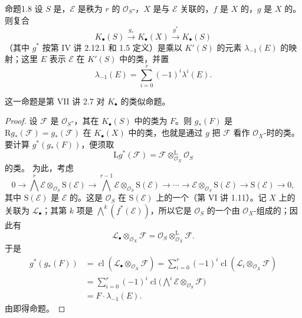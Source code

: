 \begin{SGAresult}{命题}{1.8}
设 $S$ 是，$\mathcal E$ 是秩为 $r$ 的 $\mathcal O_S$-，$X$ 是与 $\mathcal E$ 关联的，$f$ 是 $X$ 的，$g$ 是 $X$ 的。则复合
\[
K_\bullet(S)\xrightarrow{g_*}K_\bullet(X)\xrightarrow{g^*}K_\bullet(S)
\]
（其中 $g^*$ 按第 IV 讲 2.12.1 和 1.5 定义）是乘以 $K'(S)$ 的元素 $\lambda_{-1}(E)$ 的映射；这里 $E$ 表示 $\mathcal E$ 在 $K'(S)$ 中的类，并置
\[
\lambda_{-1}(E)=\sum_{i=0}^r(-1)^i\lambda^i(E).
\]
\end{SGAresult}
这一命题是第 VII 讲 2.7 对 $K_\bullet$ 的类似命题。
\begin{proof}
设 $\mathcal F$ 是 $\mathcal O_S$-，其在 $K_\bullet(S)$ 中的类为 $F$。则 $g_*(F)$ 是 $\mathrm Rg_*(\mathcal F)=g_*(\mathcal F)$ 在 $K_\bullet(X)$ 中的类，也就是通过 $g$ 把 $\mathcal F$ 看作 $\mathcal O_X$-时的类。要计算 $g^*(g_*(F))$，便须取
\[
\mathrm Lg^*(\mathcal F)=\mathcal F\mathbin{\mathop\otimes^{\mathrm L}_{\mathcal O_X}}\mathcal O_S
\]
的类。
为此，考虑
\[
0\longrightarrow\bigwedge^r\mathcal E\otimes_{\mathcal O_S}\mathrm S(\mathcal E)
\longrightarrow\bigwedge^{r-1}\mathcal E\otimes_{\mathcal O_S}\mathrm S(\mathcal E)
\longrightarrow\cdots\longrightarrow\mathcal E\otimes_{\mathcal O_S}\mathrm S(\mathcal E)
\longrightarrow\mathrm S(\mathcal E)\longrightarrow0,
\]
其中 $\mathrm S(\mathcal E)$ 是 $\mathcal E$ 的。这是 $\mathcal O_S$ 在 $\mathrm S(\mathcal E)$ 上的一个（第 VI 讲 1.11）。记 $X$ 上的关联为 $\mathcal L_\bullet$；其第 $k$ 项是 $\bigwedge^k(f^*(\mathcal E))$，所以它是 $\mathcal O_S$ 的一个由 $\mathcal O_X$-组成的；因此有
\[
\mathcal L_\bullet\otimes_{\mathcal O_X}\mathcal F
=\mathcal O_S\mathbin{\mathop\otimes^{\mathrm L}_{\mathcal O_X}}\mathcal F.
\]
于是
\[
\begin{aligned}
g^*(g_*(F))
&=\operatorname{cl}(\mathcal L_\bullet\otimes_{\mathcal O_X}\mathcal F)
=\sum_{i=0}^r(-1)^i\operatorname{cl}(\mathcal L_i\otimes_{\mathcal O_X}\mathcal F)\\
&=\sum_{i=0}^r(-1)^i\operatorname{cl}\bigl(\bigwedge^i\mathcal E\otimes_{\mathcal O_S}\mathcal F\bigr)\\
&=F\cdot\lambda_{-1}(E).
\end{aligned}
\]
由即得命题。
\end{proof}

